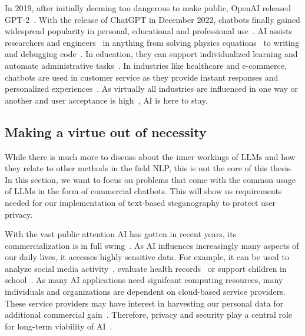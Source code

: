 In 2019, after initially deeming too dangerous to make public, OpenAI released GPT-2~\cite{hernNewAIFake2019}. With the release of ChatGPT in December 2022, chatbots finally gained widespread popularity in personal, educational and professional use~\cite{wuUnveilingSecurityPrivacy2024}. \gls{AI} assists researchers and engineers~\cite{schmidgallAgentLaboratoryUsing2025} in anything from solving physics equations~\cite{panQuantumManybodyPhysics2025,songLLMFeynmanLeveragingLarge2025} to writing and debugging code~\cite{shiCodeCorrectnessClosing2024,tianDebugBenchEvaluatingDebugging2024,leeUnifiedDebuggingApproach2024,leeGitHubRecentBugs2024}. In education, they can support individualized learning and automate administrative tasks~\cite{mienyeChatGPTEducationReview2025}. In industries like healthcare and e-commerce, chatbots are used in customer service as they provide instant responses and personalized experiences~\cite{wangELIZAChatGPTBrief2024}. As virtually all industries are influenced in one way or another and user acceptance is high~\cite{wangHistoryDevelopmentPrinciples2024,wangELIZAChatGPTBrief2024}, \gls{AI} is here to stay.

\subsection{Making a virtue out of necessity}
\label{sec:makingAVirtueOutOfNecessity}
While there is much more to discuss about the inner workings of \glspl{LLM} and how they relate to other methods in the field \gls{NLP}, this is not the core of this thesis. In this section, we want to focus on problems that come with the common usage of \glspl{LLM} in the form of commercial chatbots. This will show us requirements needed for our implementation of text-based steganography to protect user privacy.

With the vast public attention \gls{AI} has gotten in recent years, its commercialization is in full swing~\cite{soniOpenAIOutlinesNew2025}. As \gls{AI} influences increasingly many aspects of our daily lives, it accesses highly sensitive data. For example, it can be used to analyze social media activity~\cite{sufiSocialMediaAnalytics2023}, evaluate health records~\cite{lovonEvaluatingLLMAbilities2025} or support children in school~\cite{mienyeChatGPTEducationReview2025}. As many \gls{AI} applications need signifcant computing resources, many individuals and organizations are dependent on cloud-based service providers. These service providers may have interest in harvesting our personal data for additional commercial gain~\cite{biddleFacebookEngineersWe2022,mccallumMetaFacebookOwner2023}. Therefore, privacy and security play a central role for long-term viability of \gls{AI}~\cite{guptaChatGPTThreatGPTImpact2023,wuUnveilingSecurityPrivacy2024}.

